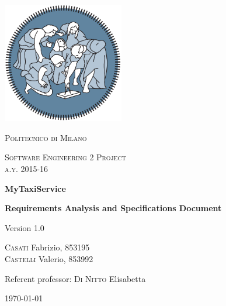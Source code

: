 

\usepackage{dottex}


%
%    

\begin{titlepage}
	\centering
	\includegraphics[width=150pt]{polimi_logo}\par\vspace{1cm}
	{\scshape\LARGE
		Politecnico di Milano\par}
	\vspace{1cm}
	{\scshape\Large
		Software Engineering 2 Project\\
		a.y. 2015-16\par}
	\vspace{1.5cm}
	{\huge\bfseries
		MyTaxiService\\\par}
	{\Large\bfseries
		Requirements Analysis and Specifications Document\par}
	Version 1.0\par
	\vspace{2cm}
	{\Large
		{\scshape Casati} Fabrizio, 853195\\
		{\scshape Castelli} Valerio, 853992\par}
	\vfill
	Referent professor: {\scshape Di Nitto} Elisabetta\par

	\vfill

	{\large\today\par}
\end{titlepage}

